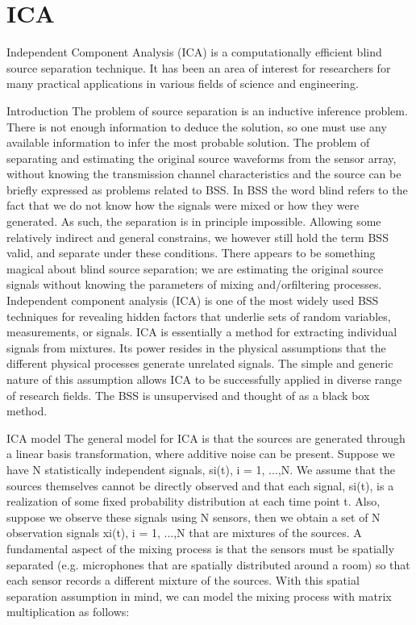 \section{ICA}
Independent Component Analysis (ICA) is a computationally efficient blind source separation technique.
It has been an area of interest for researchers for many practical applications in various fields of science and
engineering.

\cite{journals/informaticaSI/NaikK11}
\begin{compactitem}

\item {Introduction}
The problem of source separation is an inductive inference problem. There is not enough information
to deduce the solution, so one must use any available information to infer the most probable solution.
The problem of separating and estimating the original source waveforms from the sensor array,
without knowing the transmission channel characteristics and the source can be briefly expressed
as problems related to BSS. In BSS the word blind refers to the fact that we do not know how the signals
were mixed or how they were generated. As such, the separation is in principle impossible. Allowing some relatively indirect and general constrains, we however still hold the term BSS valid, and separate under these conditions. There appears to be something magical about blind source separation; we are estimating the original source signals without knowing the parameters of mixing and/orfiltering processes. Independent component analysis (ICA) is one of the most widely used BSS techniques for revealing hidden factors that underlie sets of random variables, measurements, or signals. ICA is essentially a method for extracting individual
signals from mixtures. Its power resides in the physical assumptions that the different physical processes
generate unrelated signals. The simple and generic nature of this assumption allows ICA to be successfully applied in diverse range of research fields. The BSS is unsupervised and thought of as a black box method.

\item {ICA model}
The general model for ICA is that the sources are generated
through a linear basis transformation, where additive
noise can be present. Suppose we have N statistically independent
signals, si(t), i = 1, ...,N. We assume that the
sources themselves cannot be directly observed and that
each signal, si(t), is a realization of some fixed probability
distribution at each time point t. Also, suppose we observe
these signals using N sensors, then we obtain a set of N observation
signals xi(t), i = 1, ...,N that are mixtures of the
sources. A fundamental aspect of the mixing process is that
the sensors must be spatially separated (e.g. microphones
that are spatially distributed around a room) so that each
sensor records a different mixture of the sources. With this
spatial separation assumption in mind, we can model the
mixing process with matrix multiplication as follows:


\end{compactitem}
